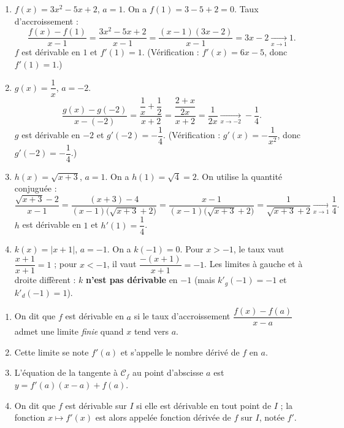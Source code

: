 \documentclass[11pt]{article}
\newcommand{\cle}[1]{{\popxbold\color{popdark}#1}}
\begin{document}
\begin{corrige}
\begin{enumerate}
    \item $f(x)=3x^2-5x+2$, $a=1$. On a $f(1)=3-5+2=0$. Taux d'accroissement :
    \[
    \frac{f(x)-f(1)}{x-1}=\frac{3x^2-5x+2}{x-1}=\frac{(x-1)(3x-2)}{x-1}=3x-2 \xrightarrow[x\to 1]{} 1.
    \]
    $f$ est dérivable en $1$ et $f'(1)=1$. (Vérification : $f'(x)=6x-5$, donc $f'(1)=1$.)
    \item $g(x)=\dfrac{1}{x}$, $a=-2$.
    \[
    \frac{g(x)-g(-2)}{x-(-2)}=\frac{\dfrac{1}{x}+\dfrac{1}{2}}{x+2}=\frac{\dfrac{2+x}{2x}}{x+2}=\frac{1}{2x}\xrightarrow[x\to -2]{} -\frac{1}{4}.
    \]
    $g$ est dérivable en $-2$ et $g'(-2)=-\dfrac{1}{4}$. (Vérification : $g'(x)=-\dfrac{1}{x^2}$, donc $g'(-2)=-\dfrac{1}{4}$.)
    \item $h(x)=\sqrt{x+3}$, $a=1$. On a $h(1)=\sqrt{4}=2$. On utilise la quantité conjuguée :
    \[
    \frac{\sqrt{x+3}-2}{x-1}=\frac{(x+3)-4}{(x-1)\bigl(\sqrt{x+3}+2\bigr)}=\frac{x-1}{(x-1)\bigl(\sqrt{x+3}+2\bigr)}=\frac{1}{\sqrt{x+3}+2}\xrightarrow[x\to 1]{} \frac{1}{4}.
    \]
    $h$ est dérivable en $1$ et $h'(1)=\dfrac{1}{4}$.
    \item $k(x)=|x+1|$, $a=-1$. On a $k(-1)=0$. Pour $x>-1$, le taux vaut $\dfrac{x+1}{x+1}=1$ ; pour $x<-1$, il vaut $\dfrac{-(x+1)}{x+1}=-1$. Les limites à gauche et à droite diffèrent : $k$ \textbf{n'est pas dérivable} en $-1$ (mais $k'_g(-1)=-1$ et $k'_d(-1)=1$).
\end{enumerate}
\end{corrige}

\begin{corrige}
\begin{enumerate}
    \item On dit que $f$ est \cle{dérivable} en $a$ si le taux d'accroissement $\dfrac{f(x)-f(a)}{x-a}$ admet une limite \emph{finie} quand $x$ tend vers $a$.
    \item Cette limite se note \cle{$f'(a)$} et s'appelle le \cle{nombre dérivé} de $f$ en $a$.
    \item L'équation de la tangente à $\mathcal{C}_f$ au point d'abscisse $a$ est \cle{$y=f'(a)(x-a)+f(a)$}.
    \item On dit que $f$ est \cle{dérivable sur $I$} si elle est dérivable en tout point de $I$ ; la fonction $x\mapsto f'(x)$ est alors appelée \cle{fonction dérivée} de $f$ sur $I$, notée $f'$.
\end{enumerate}
\end{corrige}
\end{document}
